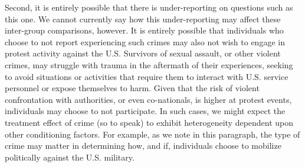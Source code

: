 Second, it is entirely possible that there is under-reporting on questions such as this one. We cannot currently say how this under-reporting may affect these inter-group comparisons, however. It is entirely possible that individuals who choose to not report experiencing such crimes may also not wish to engage in protest activity against the U.S. Survivors of sexual assault, or other violent crimes, may struggle with trauma in the aftermath of their experiences, seeking to avoid situations or activities that require them to interact with U.S. service personnel or expose themselves to harm. Given that the risk of violent confrontation with authorities, or even co-nationals, is higher at protest events, individuals may choose to not participate. In such cases, we might expect the treatment effect of crime (so to speak) to exhibit heterogeneity dependent upon other conditioning factors. For example, as we note in this paragraph, the type of crime may matter in determining how, and if, individuals choose to mobilize politically against the U.S. military.








 